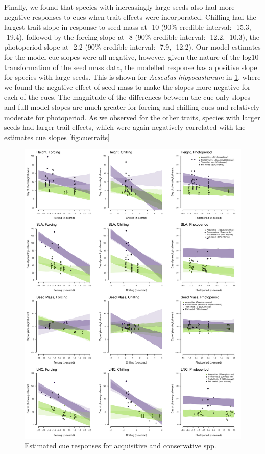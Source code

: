 \documentclass{article}\usepackage[]{graphicx}\usepackage[]{color}
\begin{document}
Finally, we found that species with increasingly large seeds also had more negative responses to cues when trait effects were incorporated. Chilling had the largest trait slope in response to seed mass at -10 (90\% credible interval: -15.3, -19.4), followed by the forcing slope at -8 (90\% credible interval: -12.2, -10.3), the photoperiod slope at -2.2 (90\% credible interval: -7.9, -12.2). Our model estimates for the model cue slopes were all negative, however, given the nature of the log10 transformation of the seed mass data, the modelled response has a positive slope for species with large seeds. This is shown for \textit{Aesculus hippocastanum} in \ref{fig:slopes}, where we found the negative effect of seed mass to make the slopes more negative for each of the cues. The magnitude of the differences between the cue only slopes and full model slopes are much greater for forcing and chilling cues and relatively moderate for photoperiod. As we observed for the other traits, species with larger seeds had larger trail effects, which were again negatively correlated with the estimates cue slopes \ref{fig:cuetraits}

\begin{figure}[h!]
    \centering
 \includegraphics[width=\textwidth]{..//..//analyses/traits/figures/slopesConsAcqu.pdf} 
    \caption{Estimated cue responses for acquisitive and conservative spp.}
    \label{fig:slopes}
\end{figure}
\end{document}
